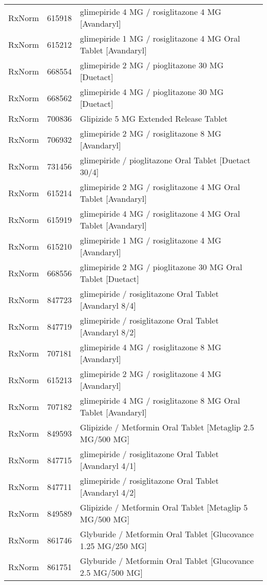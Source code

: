 \begin{longtable}{p{}p{}p{}}
  RxNorm & 615918 & glimepiride 4 MG / rosiglitazone 4 MG [Avandaryl] \\ 
  RxNorm & 615212 & glimepiride 1 MG / rosiglitazone 4 MG Oral Tablet [Avandaryl] \\ 
  RxNorm & 668554 & glimepiride 2 MG / pioglitazone 30 MG [Duetact] \\ 
  RxNorm & 668562 & glimepiride 4 MG / pioglitazone 30 MG [Duetact] \\ 
  RxNorm & 700836 & Glipizide 5 MG Extended Release Tablet \\ 
  RxNorm & 706932 & glimepiride 2 MG / rosiglitazone 8 MG [Avandaryl] \\ 
  RxNorm & 731456 & glimepiride / pioglitazone Oral Tablet [Duetact 30/4] \\ 
  RxNorm & 615214 & glimepiride 2 MG / rosiglitazone 4 MG Oral Tablet [Avandaryl] \\ 
  RxNorm & 615919 & glimepiride 4 MG / rosiglitazone 4 MG Oral Tablet [Avandaryl] \\ 
  RxNorm & 615210 & glimepiride 1 MG / rosiglitazone 4 MG [Avandaryl] \\ 
  RxNorm & 668556 & glimepiride 2 MG / pioglitazone 30 MG Oral Tablet [Duetact] \\ 
  RxNorm & 847723 & glimepiride / rosiglitazone Oral Tablet [Avandaryl 8/4] \\ 
  RxNorm & 847719 & glimepiride / rosiglitazone Oral Tablet [Avandaryl 8/2] \\ 
  RxNorm & 707181 & glimepiride 4 MG / rosiglitazone 8 MG [Avandaryl] \\ 
  RxNorm & 615213 & glimepiride 2 MG / rosiglitazone 4 MG [Avandaryl] \\ 
  RxNorm & 707182 & glimepiride 4 MG / rosiglitazone 8 MG Oral Tablet [Avandaryl] \\ 
  RxNorm & 849593 & Glipizide / Metformin Oral Tablet [Metaglip 2.5 MG/500 MG] \\ 
  RxNorm & 847715 & glimepiride / rosiglitazone Oral Tablet [Avandaryl 4/1] \\ 
  RxNorm & 847711 & glimepiride / rosiglitazone Oral Tablet [Avandaryl 4/2] \\ 
  RxNorm & 849589 & Glipizide / Metformin Oral Tablet [Metaglip 5 MG/500 MG] \\ 
  RxNorm & 861746 & Glyburide / Metformin Oral Tablet [Glucovance 1.25 MG/250 MG] \\ 
  RxNorm & 861751 & Glyburide / Metformin Oral Tablet [Glucovance 2.5 MG/500 MG] \\ 

\end{longtable}
